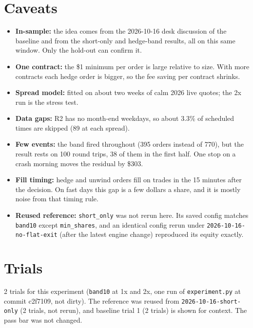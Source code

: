 \documentclass{article}
\begin{document}
\section{Caveats}

\begin{itemize}

\item \textbf{In-sample:} the idea comes from the 2026-10-16 desk discussion of the baseline and from the short-only and hedge-band results, all on this same window. Only the hold-out can confirm it.

\item \textbf{One contract:} the \$1 minimum per order is large relative to size. With more contracts each hedge order is bigger, so the fee saving per contract shrinks.

\item \textbf{Spread model:} fitted on about two weeks of calm 2026 live quotes; the 2x run is the stress test.

\item \textbf{Data gaps:} R2 has no month-end weekdays, so about 3.3\% of scheduled times are skipped (89 at each spread).

\item \textbf{Few events:} the band fired throughout (395 orders instead of 770), but the result rests on 100 round trips, 38 of them in the first half. One stop on a crash morning moves the residual by \$303.

\item \textbf{Fill timing:} hedge and unwind orders fill on trades in the 15 minutes after the decision. On fast days this gap is a few dollars a share, and it is mostly noise from that timing rule.

\item \textbf{Reused reference:} \texttt{short\_\allowbreak{}only} was not rerun here. Its saved config matches \texttt{band10} except \texttt{min\_\allowbreak{}shares}, and an identical config rerun under \texttt{2026-\allowbreak{}10-\allowbreak{}16-\allowbreak{}no-\allowbreak{}flat-\allowbreak{}exit} (after the latest engine change) reproduced its equity exactly.

\end{itemize}

\section{Trials}

2 trials for this experiment (\texttt{band10} at 1x and 2x, one run of \texttt{experiment.\allowbreak{}py} at commit c2f7109, not dirty). The reference was reused from \texttt{2026-\allowbreak{}10-\allowbreak{}16-\allowbreak{}short-\allowbreak{}only} (2 trials, not rerun), and baseline trial 1 (2 trials) is shown for context. The pass bar was not changed.
\end{document}
